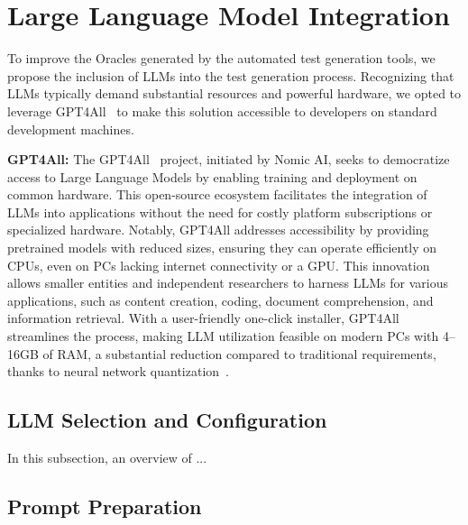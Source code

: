 \section{Large Language Model Integration}
\label{sec:llm_integration}
\vspace{0.2 cm}

To improve the Oracles generated by the automated test generation tools, we propose the inclusion of LLMs into the test generation process. Recognizing that LLMs typically demand substantial resources and powerful hardware, we opted to leverage GPT4All~\cite{noauthor_gpt4all_nodate} to make this solution accessible to developers on standard development machines.

\textbf{GPT4All:} The GPT4All~\cite{noauthor_gpt4all_nodate} project, initiated by Nomic AI, seeks to democratize access to Large Language Models by enabling training and deployment on common hardware. This open-source ecosystem facilitates the integration of LLMs into applications without the need for costly platform subscriptions or specialized hardware. Notably, GPT4All addresses accessibility by providing pretrained models with reduced sizes, ensuring they can operate efficiently on CPUs, even on PCs lacking internet connectivity or a GPU. This innovation allows smaller entities and independent researchers to harness LLMs for various applications, such as content creation, coding, document comprehension, and information retrieval. With a user-friendly one-click installer, GPT4All streamlines the process, making LLM utilization feasible on modern PCs with 4–16GB of RAM, a substantial reduction compared to traditional requirements, thanks to neural network quantization~\cite{han_deep_2016}.

\vspace{0.1 cm}
\subsection{LLM Selection and Configuration}
\label{sec:llm_configurations}
\vspace{0.1 cm}

In this subsection, an overview of ...

\vspace{0.1 cm}
\subsection{Prompt Preparation}
\label{sec:prompt_preparation}
\vspace{0.1 cm}

